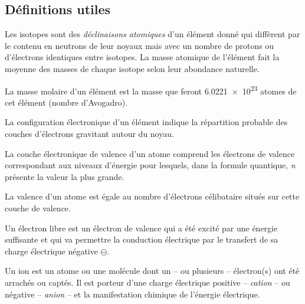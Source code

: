 \subsection{Définitions utiles}

\begin{definition}[Isotope]
Les isotopes sont des \emph{déclinaisons atomiques} d'un élément donné qui diffèrent par le contenu en neutrons de leur noyaux mais avec un nombre de protons ou d'électrons identiques entre isotopes. La masse atomique de l'élément fait la moyenne des masses de chaque isotope selon leur abondance naturelle.
\end{definition}

\begin{definition}
La masse molaire d'un élément est la masse que feront \num{6,0221e23} atomes de cet élément (nombre d'Avogadro).
\end{definition}

\begin{definition}
La configuration électronique d'un élément indique la répartition probable des couches d'électrons gravitant autour du noyau.
\end{definition}

\begin{definition}
La couche électronique de valence d'un atome comprend les électrons de valence correspondant aux
niveaux d'énergie pour lesquels, dans la formule quantique, \emph{n} présente la valeur la plus grande.
\end{definition}

\begin{definition}
La valence d'un atome est égale au nombre d'électrons célibataire situés sur cette couche de valence.
\end{definition}

\begin{definition}
Un électron libre est un électron de valence qui a été excité par une énergie suffisante et qui va permettre la conduction électrique par le transfert de sa charge électrique négative $\ominus$.
\end{definition}

\begin{definition}[Ion]
Un ion est un atome ou une molécule dont un -- ou plusieurs -- électron(s) ont été arrachés ou captés. Il est porteur d'une charge électrique positive -- \emph{cation} -- ou négative -- \emph{anion} -- et la manifestation chimique de l'énergie électrique.
\end{definition}

